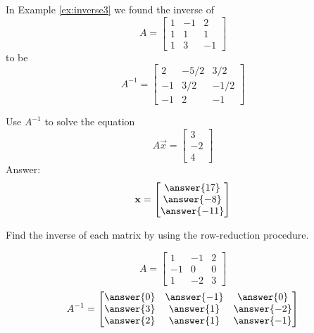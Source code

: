 \documentclass{ximera}
\begin{document}
\begin{problem}\label{prob:solvesysbyinverses}
In Example \ref{ex:inverse3} we found the inverse of $$A=\begin{bmatrix}1&-1&2\\1&1&1\\1&3&-1\end{bmatrix}$$
to be 
$$A^{-1}=\begin{bmatrix}2&-5/2&3/2\\-1&3/2&-1/2\\-1&2&-1\end{bmatrix}$$

Use $A^{-1}$ to solve the equation
$$A\vec{x}=\begin{bmatrix}3\\-2\\4\end{bmatrix}$$
Answer:
$$\vec{x}=\begin{bmatrix}\answer{17}\\\answer{-8}\\\answer{-11}\end{bmatrix}$$

\end{problem}

\begin{problem}\label{prob:findinverse1}
Find the inverse of each matrix by using the row-reduction procedure.  

  $$A=\begin{bmatrix}1&-1&2\\-1&0&0\\1&-2&3\end{bmatrix}$$
  $$A^{-1}=\begin{bmatrix}\answer{0} & \answer{-1} & \answer{0} \\ \answer{3} & \answer{1} & \answer{-2}\\ \answer{2} & \answer{1} & \answer{-1}\end{bmatrix}$$

\end{problem}


\end{document}
